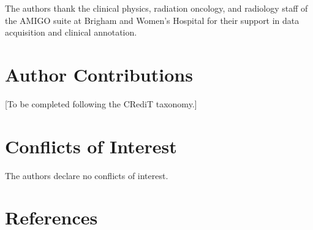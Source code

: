 \documentclass[
  11pt,
]{article}
\begin{document}
The authors thank the clinical physics, radiation oncology, and
radiology staff of the AMIGO suite at Brigham and Women's Hospital for
their support in data acquisition and clinical annotation.

\section*{Author Contributions}\label{author-contributions}

{[}To be completed following the CRediT taxonomy.{]}

\section*{Conflicts of Interest}\label{conflicts-of-interest}

The authors declare no conflicts of interest.

\section*{References}\label{references}
\end{document}
